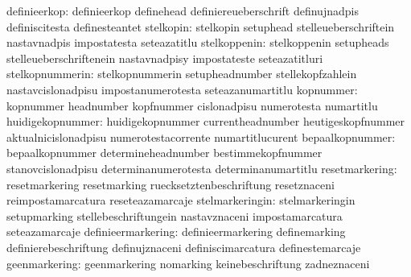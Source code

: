                     definieerkop: definieerkop                     definehead
                                  definiereueberschrift            definujnadpis
                                  definiscitesta                   definesteantet
                       stelkopin: stelkopin                        setuphead
                                  stelleueberschriftein            nastavnadpis
                                  impostatesta                     seteazatitlu
                    stelkoppenin: stelkoppenin                     setupheads
                                  stelleueberschriftenein          nastavnadpisy
                                  impostateste                     seteazatitluri
                 stelkopnummerin: stelkopnummerin                  setupheadnumber
                                  stellekopfzahlein                nastavcislonadpisu
                                  impostanumerotesta               seteazanumartitlu
                       kopnummer: kopnummer                        headnumber
                                  kopfnummer                       cislonadpisu
                                  numerotesta                      numartitlu
                huidigekopnummer: huidigekopnummer                 currentheadnumber
                                  heutigeskopfnummer               aktualnicislonadpisu
                                  numerotestacorrente              numartitlucurent
                 bepaalkopnummer: bepaalkopnummer                  determineheadnumber
                                  bestimmekopfnummer               stanovcislonadpisu
                                  determinanumerotesta             determinanumartitlu
                  resetmarkering: resetmarkering                   resetmarking
                                  ruecksetztenbeschriftung         resetznaceni
                                  reimpostamarcatura               reseteazamarcaje
                 stelmarkeringin: stelmarkeringin                  setupmarking
                                  stellebeschriftungein            nastavznaceni
                                  impostamarcatura                 seteazamarcaje
              definieermarkering: definieermarkering               definemarking
                                  definierebeschriftung            definujznaceni
                                  definiscimarcatura               definestemarcaje
                   geenmarkering: geenmarkering                    nomarking
                                  keinebeschriftung                zadneznaceni
